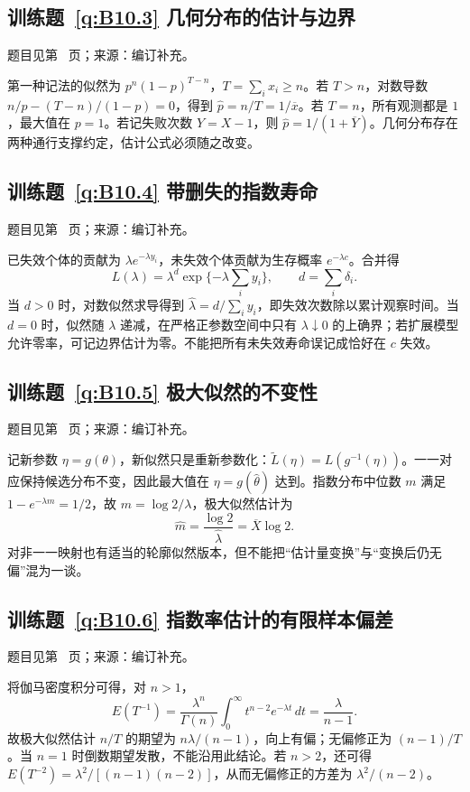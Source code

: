 \documentclass[UTF8,12pt,a4paper,fontset=fandol]{ctexbook}
\begin{document}
\subsection*{训练题~\ref{q:B10.3} 几何分布的估计与边界}\label{a:B10.3}{\small 题目见第~\pageref{q:B10.3} 页；来源：编订补充。}
\begin{solve}第一种记法的似然为 $p^n(1-p)^{T-n}$，$T=\sum_i x_i\ge n$。若 $T>n$，对数导数 $n/p-(T-n)/(1-p)=0$，得到 $\widehat p=n/T=1/\overline x$。若 $T=n$，所有观测都是 $1$，最大值在 $p=1$。若记失败次数 $Y=X-1$，则 $\widehat p=1/(1+\overline Y)$。几何分布存在两种通行支撑约定，估计公式必须随之改变。\end{solve}

\subsection*{训练题~\ref{q:B10.4} 带删失的指数寿命}\label{a:B10.4}{\small 题目见第~\pageref{q:B10.4} 页；来源：编订补充。}
\begin{solve}已失效个体的贡献为 $\lambda e^{-\lambda y_i}$，未失效个体贡献为生存概率 $e^{-\lambda c}$。合并得\[L(\lambda)=\lambda^d\exp\{-\lambda\sum_i y_i\},\qquad d=\sum_i\delta_i.\]当 $d>0$ 时，对数似然求导得到 $\widehat\lambda=d/\sum_i y_i$，即失效次数除以累计观察时间。当 $d=0$ 时，似然随 $\lambda$ 递减，在严格正参数空间中只有 $\lambda\downarrow0$ 的上确界；若扩展模型允许零率，可记边界估计为零。不能把所有未失效寿命误记成恰好在 $c$ 失效。\end{solve}

\subsection*{训练题~\ref{q:B10.5} 极大似然的不变性}\label{a:B10.5}{\small 题目见第~\pageref{q:B10.5} 页；来源：编订补充。}
\begin{solve}记新参数 $\eta=g(\theta)$，新似然只是重新参数化：$\widetilde L(\eta)=L(g^{-1}(\eta))$。一一对应保持候选分布不变，因此最大值在 $\eta=g(\widehat\theta)$ 达到。指数分布中位数 $m$ 满足 $1-e^{-\lambda m}=1/2$，故 $m=\log2/\lambda$，极大似然估计为\[\widehat m=\frac{\log2}{\widehat\lambda}=\overline X\log2.\]对非一一映射也有适当的轮廓似然版本，但不能把“估计量变换”与“变换后仍无偏”混为一谈。\end{solve}

\subsection*{训练题~\ref{q:B10.6} 指数率估计的有限样本偏差}\label{a:B10.6}{\small 题目见第~\pageref{q:B10.6} 页；来源：编订补充。}
\begin{solve}将伽马密度积分可得，对 $n>1$，\[E(T^{-1})=\frac{\lambda^n}{\Gamma(n)}\int_0^\infty t^{n-2}e^{-\lambda t}\,dt=\frac{\lambda}{n-1}.\]故极大似然估计 $n/T$ 的期望为 $n\lambda/(n-1)$，向上有偏；无偏修正为 $(n-1)/T$。当 $n=1$ 时倒数期望发散，不能沿用此结论。若 $n>2$，还可得 $E(T^{-2})=\lambda^2/[(n-1)(n-2)]$，从而无偏修正的方差为 $\lambda^2/(n-2)$。\end{solve}
\end{document}

